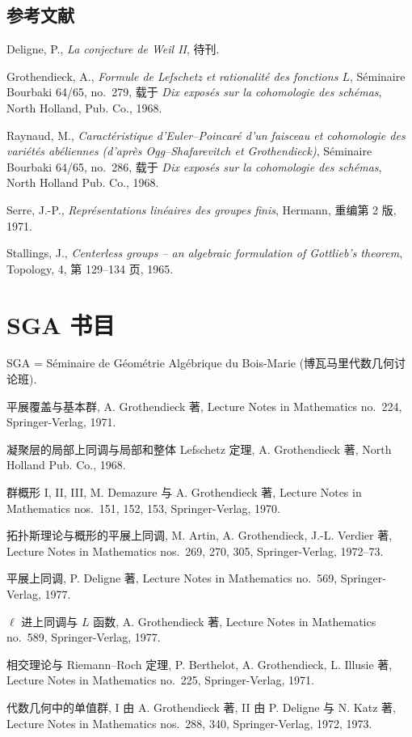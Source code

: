 \subsection*{参考文献}
\begin{enumerate}[label={[\arabic*]}]
\item Deligne, P., \emph{La conjecture de Weil II}, 待刊.
\item Grothendieck, A., \emph{Formule de Lefschetz et rationalité des fonctions $L$}, Séminaire Bourbaki 64/65, no.~279, 载于 \emph{Dix exposés sur la cohomologie des schémas}, North Holland, Pub. Co., 1968.
\item Raynaud, M., \emph{Caractéristique d'Euler--Poincaré d'un faisceau et cohomologie des variétés abéliennes (d'après Ogg--Shafarevitch et Grothendieck)}, Séminaire Bourbaki 64/65, no.~286, 载于 \emph{Dix exposés sur la cohomologie des schémas}, North Holland Pub. Co., 1968.
\item Serre, J.-P., \emph{Représentations linéaires des groupes finis}, Hermann, 重编第 2 版, 1971.
\item Stallings, J., \emph{Centerless groups -- an algebraic formulation of Gottlieb's theorem}, Topology, 4, 第 129--134 页, 1965.
\end{enumerate}

\clearpage
{}
\section*{SGA 书目}
SGA = Séminaire de Géométrie Algébrique du Bois-Marie (博瓦马里代数几何讨论班).
\begin{description}[style=nextline]
\item[SGA 1] 平展覆盖与基本群, A. Grothendieck 著, Lecture Notes in Mathematics no.~224, Springer-Verlag, 1971.
\item[SGA 2] 凝聚层的局部上同调与局部和整体 Lefschetz 定理, A. Grothendieck 著, North Holland Pub. Co., 1968.
\item[SGA 3] 群概形 I, II, III, M. Demazure 与 A. Grothendieck 著, Lecture Notes in Mathematics nos.~151, 152, 153, Springer-Verlag, 1970.
\item[SGA 4] 拓扑斯理论与概形的平展上同调, M. Artin, A. Grothendieck, J.-L. Verdier 著, Lecture Notes in Mathematics nos.~269, 270, 305, Springer-Verlag, 1972--73.
\item[SGA $4^{1/2}$] 平展上同调, P. Deligne 著, Lecture Notes in Mathematics no.~569, Springer-Verlag, 1977.
\item[SGA 5] $\ell$ 进上同调与 $L$ 函数, A. Grothendieck 著, Lecture Notes in Mathematics no.~589, Springer-Verlag, 1977.
\item[SGA 6] 相交理论与 Riemann--Roch 定理, P. Berthelot, A. Grothendieck, L. Illusie 著, Lecture Notes in Mathematics no.~225, Springer-Verlag, 1971.
\item[SGA 7] 代数几何中的单值群, I 由 A. Grothendieck 著, II 由 P. Deligne 与 N. Katz 著, Lecture Notes in Mathematics nos.~288, 340, Springer-Verlag, 1972, 1973.
\end{description}
\clearpage
